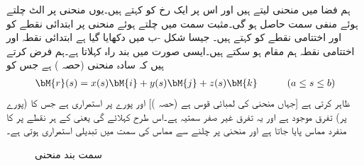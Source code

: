 ہم فضا میں منحنی  لیتے ہیں اور اس پر ایک رخ کو  کہتے ہیں۔یوں منحنی پر الٹ چلتے ہوئے منفی سمت حاصل ہو گی۔مثبت سمت میں چلتے ہوئے منحنی پر ابتدائی نقطے کو  اور اختتامی نقطے کو  کہتے ہیں۔ جیسا شکل -ب میں دکھایا گیا ہے ابتدائی نقطہ اور اختتامی نقطہ ہم مقام ہو سکتے ہیں۔ایسی صورت میں  بند راہ کہلاتا ہے۔ہم فرض کرتے ہیں کہ  سادہ منحنی (حصہ ) ہے  جس کو
\begin{align}\label{مساوات_سمتی_تکمل_راہ_الف}
\bM{r}(s)=x(s)\bM{i}+y(s)\bM{j}+z(s)\bM{k}\quad \quad \quad (a\le s\le b)
\end{align}
 ظاہر کرتی ہے [جہاں  منحنی کی لمبائی قوس ہے (حصہ )] اور پورے  پر  استمراری ہے جس کا (پورے  پر)   تفرق  موجود ہے اور یہ تفرق غیر صفر سمتیہ ہے۔اس طرح   کہلائے گی یعنی  کے ہر نقطے پر  کا منفرد مماس پایا جاتا ہے  اور منحنی پر چلنے سے مماس کی سمت میں تبدیلی استمراری ہوتی ہے۔
\begin{figure}
\centering
\begin{subfigure}{0.45\textwidth}
\centering
{}
\caption{}
\end{subfigure} \hfill
\begin{subfigure}{0.45\textwidth}
\centering
{}
\caption{}
\end{subfigure} \hfill
\caption{سمت بند منحنی}
\label{شکل_سمتی_تکمل_سمت_بند_منحنی}
\end{figure}

